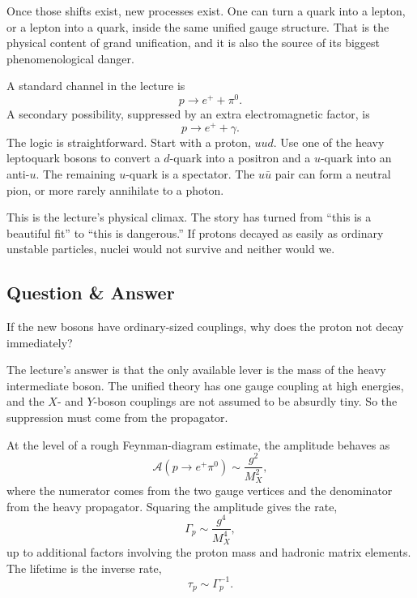 Once those shifts exist, new processes exist. One can turn a quark into a lepton, or a lepton into a quark, inside the same unified gauge structure. That is the physical content of grand unification, and it is also the source of its biggest phenomenological danger.

A standard channel in the lecture is
\begin{equation}
p\to e^+ + \pi^0.
\end{equation}
A secondary possibility, suppressed by an extra electromagnetic factor, is
\begin{equation}
p\to e^+ + \gamma.
\end{equation}
The logic is straightforward. Start with a proton, \(uud\). Use one of the heavy leptoquark bosons to convert a \(d\)-quark into a positron and a \(u\)-quark into an anti-\(u\). The remaining \(u\)-quark is a spectator. The \(u\bar u\) pair can form a neutral pion, or more rarely annihilate to a photon.

This is the lecture's physical climax. The story has turned from ``this is a beautiful fit'' to ``this is dangerous.'' If protons decayed as easily as ordinary unstable particles, nuclei would not survive and neither would we.

\subsection{Question \& Answer}

If the new bosons have ordinary-sized couplings, why does the proton not decay immediately?

The lecture's answer is that the only available lever is the mass of the heavy intermediate boson. The unified theory has one gauge coupling at high energies, and the \(X\)- and \(Y\)-boson couplings are not assumed to be absurdly tiny. So the suppression must come from the propagator.

At the level of a rough Feynman-diagram estimate, the amplitude behaves as
\begin{equation}
\mathcal A(p\to e^+\pi^0)\sim \frac{g^2}{M_X^2},
\end{equation}
where the numerator comes from the two gauge vertices and the denominator from the heavy propagator. Squaring the amplitude gives the rate,
\begin{equation}
\Gamma_p \sim \frac{g^4}{M_X^4},
\end{equation}
up to additional factors involving the proton mass and hadronic matrix elements. The lifetime is the inverse rate,
\begin{equation}
\tau_p\sim \Gamma_p^{-1}.
\end{equation}

